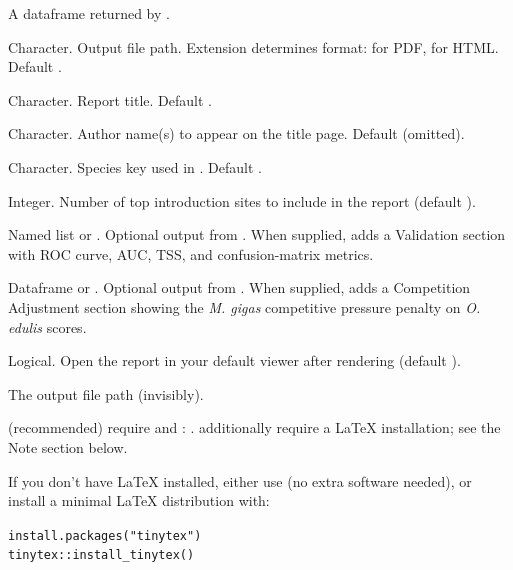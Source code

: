 \documentclass[a4paper]{book}
\begin{document}
\begin{Arguments}
\begin{ldescription}
\item[\code{result}] A dataframe returned by .

\item[\code{output}] Character. Output file path. Extension determines format:
 for PDF,  for HTML. Default .

\item[\code{title}] Character. Report title. Default .

\item[\code{author}] Character. Author name(s) to appear on the title page.
Default  (omitted).

\item[\code{species}] Character. Species key used in .
Default .

\item[\code{top\_n}] Integer. Number of top introduction sites to include in the
report (default ).

\item[\code{validation}] Named list or . Optional output from
. When supplied, adds a Validation section
with ROC curve, AUC, TSS, and confusion-matrix metrics.

\item[\code{comparison}] Dataframe or . Optional output from
. When supplied, adds a Competition Adjustment section
showing the \emph{M. gigas} competitive pressure penalty on \emph{O. edulis} scores.

\item[\code{open}] Logical. Open the report in your default viewer after rendering
(default ).
\end{ldescription}
\end{Arguments}
%
\begin{Value}
The output file path (invisibly).
\end{Value}
%
\begin{Note}
 (recommended) require  and :
.
 additionally require a LaTeX installation; see the
Note section below.

 If you don't have LaTeX installed,
either use  (no extra software needed), or install
a minimal LaTeX distribution with:

\begin{alltt}install.packages("tinytex")
tinytex::install_tinytex()
\end{alltt}

\end{Note}
\end{document}
